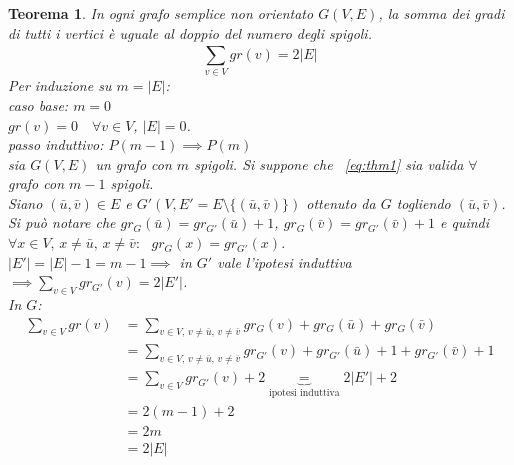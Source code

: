 \documentclass[a4paper, oneside, openany]{book}
\theoremstyle{plain}
\newtheorem{thm}{Teorema}[section]
\theoremstyle{definition}
\begin{document}
\begin{thm}
In ogni grafo semplice non orientato $G(V,E)$, la somma dei gradi di tutti i vertici è
uguale al doppio del numero degli spigoli.
\begin{equation} \label{eq:thm1} \sum_{v \in V}^{} gr(v) = 2|E| \end{equation}
\proof
	Per induzione su $m = |E|$:\\
	\emph{caso base: $m = 0$}\\	
	\indent $gr(v) = 0 \quad \forall v \in V$, \quad $|E| = 0$.\\
	\emph{passo induttivo:} $P(m-1) \implies P(m)$\\
	\indent sia $G(V,E)$ un grafo con $m$ spigoli. Si suppone che ~\ref{eq:thm1} 
	sia valida $\forall$ grafo con $m-1$ spigoli.\\
	Siano $(\bar{u}, \bar{v}) \in E$ e $G'(V, E'=E \setminus \{(\bar{u}, \bar{v})\})$ ottenuto da $G$ togliendo 
	$(\bar{u}, \bar{v})$.\\
	Si può notare che $gr_G(\bar{u})= gr_{G'}(\bar{u})+1$, $gr_G(\bar{v}) = gr_{G'}(\bar{v})+1$ e quindi
	${\forall x \in V \text{, } x \neq \bar{u} \text{, }  x \neq \bar{v}: \text{ } gr_G(x) = gr_{G'}(x)}$.\\%
	$|E'| = |E|-1 = m -1 \implies$ in $G'$ vale l'ipotesi induttiva 
    ${\implies \sum_{v \in V}^{} gr_{G'}(v) = 2|E'|}$.\\In $G$:
    \begin{equation*}%
    \begin{split}
	 \sum_{v \in V}^{} gr(v) & = 
     \sum_{v \in V \text{, } v \neq \bar{u} \text{, } v \neq \bar{v} }^{} 
        gr_G(v)+gr_G(\bar{u})+gr_G(\bar{v}) \\ & =
	 \sum_{v\in V\text{, }v\neq \bar{u}\text{, } v\neq \bar{v} }^{} 
        gr_{G'}(v)+gr_{G'}(\bar{u})+1 +gr_{G'}(\bar{v}) +1 \\ & =
	 \sum_{v \in V}^{} gr_{G'}(v) + 2 \underbrace{=}_{\text{ipotesi induttiva}} 2|E'| + 2 \\
     & = 2(m-1) + 2 \\
	 & = 2m \\ & = 2|E|
    \end{split}
    \end{equation*}
\endproof
\end{thm}
\end{document}
